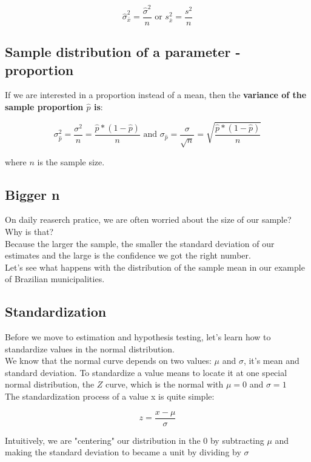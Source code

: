 \documentclass[11pt]{article}
\begin{document}
\[\hat{\sigma}_{\bar{x}}^2 = \frac{\hat{\sigma}^2}{n} \text{  or  } s_{\bar{x}}^2 = \frac{s^2}{n}\]

	\subsection*{Sample distribution of a parameter - proportion}

	If we are interested in a proportion instead of a mean, then the \textbf{variance of the sample proportion $\hat{p}$ is}:

\[\sigma_{\hat{p}}^2 = \frac{\sigma^2}{n} = \frac{\hat{p} * (1-\hat{p})}{n} \text{ and }\sigma_{\hat{p}} = \frac{\sigma}{\sqrt{n}} = \sqrt{\frac{\hat{p} * (1-\hat{p})}{n}}\]

where $n$ is the sample size.


	\subsection*{Bigger n}

	On daily reaserch pratice, we are often worried about the size of our sample? Why is that?\\

	Because the larger the sample, the smaller the standard deviation of our estimates and the large is the confidence we got the right number.\\
	
	Let's see what happens with the distribution of the sample mean in our example of Brazilian municipalities.



	\subsection*{Standardization}
	Before we move to estimation and hypothesis testing, let's learn how to standardize values in the normal distribution.\\
	
	We know that the normal curve depends on two values: $\mu$ and $\sigma$, it's mean and standard deviation. To standardize a value means to locate it at one special normal distribution, the $Z$ curve, which is the normal with $\mu =0 $ and $\sigma =1$\\

	The standardization process of a value x is quite simple:

	\[z=\frac{x - \mu}{\sigma}\]

	Intuitively, we are "centering" our distribution in the 0 by subtracting $\mu$ and making the standard deviation to became a unit by dividing by $\sigma$ 
\end{document}
